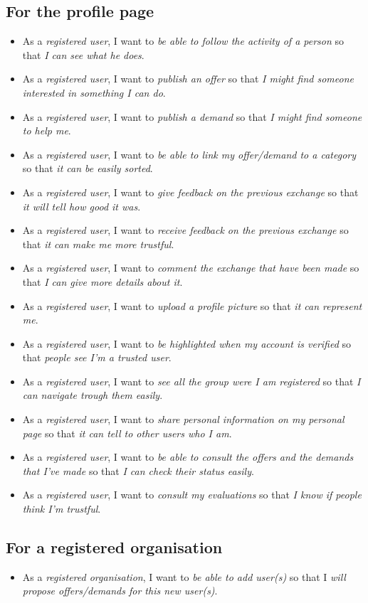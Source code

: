 \subsection{For the profile page}
\begin{itemize}
    \item As a \textit{registered user}, I want to \textit{be able to follow the activity of a person} so that \textit{I can see what he does}.
    \item As a \textit{registered user}, I want to \textit{publish an offer} so that \textit{I might find someone interested in something I can do}.
    \item As a \textit{registered user}, I want to \textit{publish a demand} so that \textit{I might find someone to help me}.
    \item As a \textit{registered user}, I want to \textit{be able to link my offer/demand to a category} so that \emph{it can be easily sorted}.
    \item As a \textit{registered user}, I want to \textit{give feedback on the previous exchange} so that \textit{it will tell how good it was}.
    \item As a \textit{registered user}, I want to \textit{receive feedback on the previous exchange} so that \textit{it can make me more trustful}.
    \item As a \textit{registered user}, I want to \textit{comment the exchange that have been made} so that \textit{I can give more details about it}.
    \item As a \textit{registered user}, I want to \textit{upload a profile picture} so that \textit{it can represent me}.
    \item As a \textit{registered user}, I want to \textit{be highlighted when my account is verified} so that \textit{people see I'm a trusted user}.
    \item As a \textit{registered user}, I want to \textit{see all the group were I am registered} so that \textit{I can navigate trough them easily}.
    \item As a \textit{registered user}, I want to \textit{share personal information on my personal page} so that \textit{it can tell to other users who I am}.
    \item As a \textit{registered user}, I want to \textit{be able to consult the offers and the demands that I've made} so that \textit{I can check their status easily}.
    \item As a \textit{registered user}, I want to \textit{consult my evaluations} so that \textit{I know if people think I'm trustful}.
\end{itemize}

\subsection{For a registered organisation}
\begin{itemize}

    \item As a \textit{registered organisation}, I want to \textit{be able to add  user(s)} so that I \textit{will propose offers/demands for this new user(s)}.

\end{itemize}